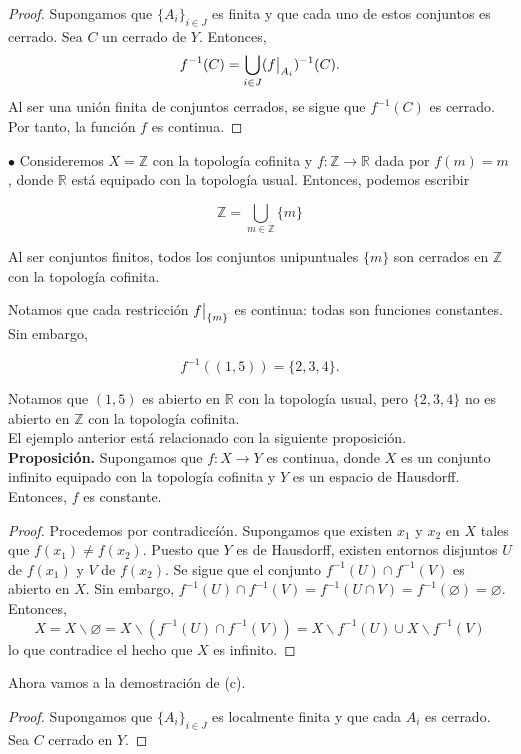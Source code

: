 \documentclass{article}
\newcommand\restr[2]{{%
		\left.\kern-\nulldelimiterspace %
		#1 %
		\vphantom{\big|} %
		\right|_{#2} %
}}
\begin{document}
\begin{proof}
	Supongamos que $\{ A_{i} \}_{i \in J}$ es finita y que cada uno de estos conjuntos es cerrado. Sea $C$ un cerrado de $Y$. Entonces, 
	$$ f^{-1}(C) = \bigcup_{i \in J} ( \restr{f}{A_{i}} )^{-1}(C) .$$
	Al ser una unión finita de conjuntos cerrados, se sigue que $f^{-1}(C)$ es cerrado. Por tanto, la función $f$ es continua.
\end{proof}

$\bullet$ Consideremos $X = \mathbb{Z}$ con la topología cofinita  y $f: \mathbb{Z} \rightarrow \mathbb{R}$ dada por $f(m) = m$, donde $\mathbb{R}$ está equipado con la topología usual. Entonces, podemos escribir

$$ \mathbb{Z} = \bigcup_{m \in \mathbb{Z}} \{ m \} $$

Al ser conjuntos finitos, todos los conjuntos unipuntuales $\{m \}$ son cerrados en $\mathbb{Z}$ con la topología cofinita.

Notamos que cada restricción $\restr{f}{\{m \}}$ es continua: todas son funciones constantes. Sin embargo, 

$$ f^{-1}((1, 5)) = \{ 2, 3, 4 \}.$$

Notamos que $(1, 5)$ es abierto en $\mathbb{R}$ con la topología usual, pero $\{ 2, 3, 4 \}$ no es abierto en $\mathbb{Z}$ con la topología cofinita. \\

El ejemplo anterior está relacionado con la siguiente proposición. \\

\textbf{Proposición. } Supongamos que $f:X \rightarrow Y$ es continua, donde $X$ es un conjunto infinito equipado con la topología cofinita y $Y$ es un espacio de Hausdorff. Entonces, $f$ es constante. 
\begin{proof}
Procedemos por contradiccíón. Supongamos que existen $x_{1}$ y $x_{2}$ en $X$ tales que $f(x_{1}) \neq f(x_{2})$. Puesto que $Y$ es de Hausdorff, existen entornos disjuntos $U$ de $f(x_{1})$ y $V$ de $f(x_{2})$. Se sigue que el conjunto $f^{-1}(U) \cap f^{-1}(V)$ es abierto en $X$. Sin embargo, $f^{-1}(U) \cap f^{-1}(V) =f^{-1}(U \cap V) = f^{-1}(\varnothing) = \varnothing  $.  Entonces,
$$ X = X \backslash \varnothing = X \backslash (f^{-1}(U) \cap f^{-1}(V)) = X \backslash f^{-1}(U) \cup X \backslash f^{-1}(V)$$ 
lo que contradice el hecho que $X$ es infinito. 
\end{proof}

Ahora vamos a la demostración de (c).

\begin{proof}
	Supongamos que $\{ A_{i} \}_{i \in J}$ es localmente finita y que cada $A_{i}$ es cerrado. Sea $C$ cerrado en $Y$. 
\end{proof}
\end{document}
